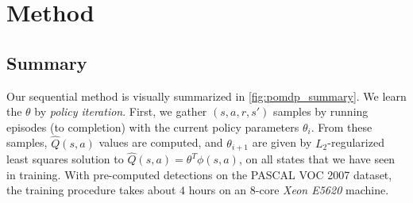 \section{Method}\label{sec:det_method}







\subsection{Summary}



Our sequential method is visually summarized in \autoref{fig:pomdp_summary}.
We learn the $\theta$ by \emph{policy iteration}.
First, we gather $(s, a, r, s')$ samples by running episodes (to completion) with the current policy parameters $\theta_i$.
From these samples, $\hat{Q}(s, a)$ values are computed, and $\theta_{i+1}$ are given by $L_2$-regularized least squares solution to $\hat{Q}(s, a) = \theta^T \phi(s, a)$, on all states that we have seen in training.
With pre-computed detections on the PASCAL VOC 2007 dataset, the training procedure takes about $4$ hours on an $8$-core \emph{Xeon E5620} machine.
